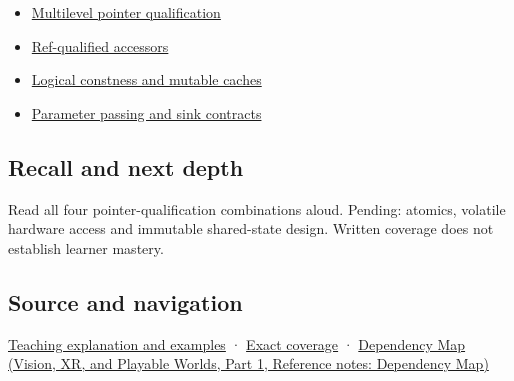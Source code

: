 \begin{itemize}
\tightlist
\item
  \hyperref[appendix-5e1a7561cd98]{Multilevel pointer qualification}
\item
  \hyperref[appendix-d42039b1d6f7]{Ref-qualified accessors}
\item
  \hyperref[appendix-f5593256bcaf]{Logical constness and mutable caches}
\item
  \hyperref[appendix-d5908f75721f]{Parameter passing and sink contracts}
\end{itemize}

\subsection{Recall and next depth}\label{appendix-c25d60fed375-recall-and-next-depth}

\hypertarget{appendix-c25d60fed375-recall-and-next-depth}{}

Read all four pointer-qualification combinations aloud. Pending: atomics, volatile hardware access and immutable shared-state design. Written coverage does not establish learner mastery.

\subsection{Source and navigation}\label{appendix-c25d60fed375-source-and-navigation}

\hypertarget{appendix-c25d60fed375-source-and-navigation}{}

\hyperref[01-foundations-i-ch003-read-only-is-a-path-not-an-ownership-or-synchronization-promise]{Teaching explanation and examples} · \hyperref[appendix-fd090d982a15-m008---parts-113-126]{Exact coverage} · \href{../07-Vision-XR-and-Playable-Worlds-P01/main.pdf\#appendix-4ad47bdd269a}{Dependency Map (Vision, XR, and Playable Worlds, Part 1, Reference notes: Dependency Map)}
